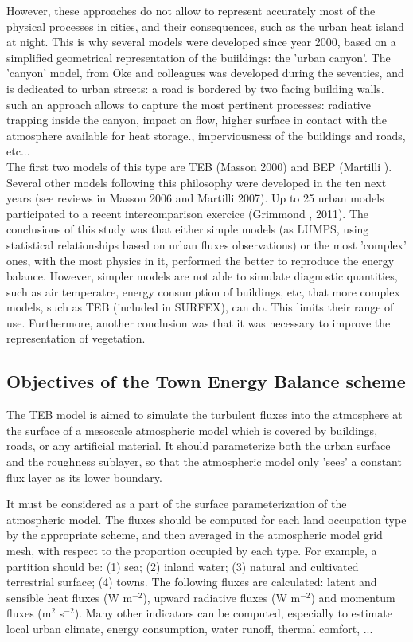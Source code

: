However, these approaches do not allow to represent accurately most of the physical processes in cities, and their consequences, such as the urban heat island at night. This is why several models were developed since year 2000, based on a simplified geometrical representation of the buiildings: the 'urban canyon'. The 'canyon' model, from Oke and colleagues was developed during the seventies, and is dedicated to urban streets:
a road is bordered by two facing building walls. such an approach allows to capture the most pertinent processes: radiative trapping inside the canyon, impact on flow, higher surface in contact with the atmosphere available for heat storage., imperviousness of the buildings and roads, etc... \\

The first two models of this type are TEB (Masson 2000\nocite{Masson2000}) and BEP (Martilli \nocite{Martilli2002}). Several other models following this philosophy were developed in the ten next years (see reviews in Masson 2006\nocite{Masson2006} and Martilli 2007\nocite{Martilli2007}). Up to 25 urban models participated to a recent intercomparison exercice (Grimmond , 2011\nocite{Grimmond2010}\nocite{Grimmond2011}). The conclusions of this study was that either simple models (as LUMPS, using statistical relationships based on urban fluxes observations) or the most 'complex' ones, with the most physics in it, performed the better to reproduce the energy balance. However, simpler models are not able to simulate diagnostic quantities, such as air temperatre, energy consumption of buildings, etc, that more complex models, such as TEB (included in SURFEX), can do. This limits their range of use. Furthermore, another conclusion was that it was necessary to improve the representation of vegetation. 

\subsection{Objectives of the Town Energy Balance scheme}

The TEB model is aimed
to simulate the turbulent fluxes into the atmosphere
at the surface of a mesoscale atmospheric model which is covered
by buildings, roads, or any artificial material.
It should parameterize both the urban surface and the roughness sublayer,
so that the atmospheric model only 'sees' a constant flux layer
as its lower boundary.

It must be considered as a part of the surface parameterization
of the atmospheric model. The fluxes should be computed for each 
land occupation type
by the appropriate scheme, and then averaged in the atmospheric model grid
mesh, with respect to the proportion occupied by each type.
For example, a partition should be:
(1) sea; (2) inland water; (3) natural and cultivated terrestrial surface;
(4) towns. The following fluxes are calculated:
latent and sensible heat fluxes (W m$^{-2}$), upward radiative fluxes
(W m$^{-2}$) and momentum fluxes (m$^2$ s$^{-2}$). Many other indicators can be computed, especially to estimate local urban climate, energy consumption, water runoff, thermal comfort, ... \\



